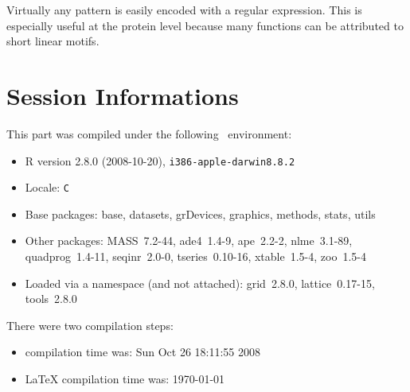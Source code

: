 \documentclass{article}
\begin{document}
Virtually any pattern is easily encoded with a regular expression. This is
especially useful at the protein level because many functions can be attributed 
to short linear motifs.


\section*{Session Informations}

This part was compiled under the following \Rlogo{}~environment:

\begin{itemize}
  \item R version 2.8.0 (2008-10-20), \verb|i386-apple-darwin8.8.2|
  \item Locale: \verb|C|
  \item Base packages: base, datasets, grDevices, graphics, methods,
    stats, utils
  \item Other packages: MASS~7.2-44, ade4~1.4-9, ape~2.2-2,
    nlme~3.1-89, quadprog~1.4-11, seqinr~2.0-0, tseries~0.10-16,
    xtable~1.5-4, zoo~1.5-4
  \item Loaded via a namespace (and not attached): grid~2.8.0,
    lattice~0.17-15, tools~2.8.0
\end{itemize}
There were two compilation steps:

\begin{itemize}
  \item \Rlogo{} compilation time was: Sun Oct 26 18:11:55 2008
  \item \LaTeX{} compilation time was: \today
\end{itemize}


\clearpage
{}


\end{document}
